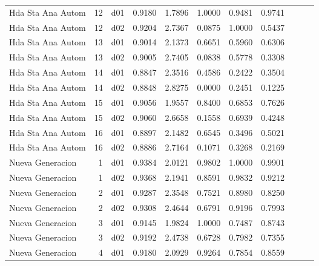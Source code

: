 \begin{landscape}
\begin{longtable}{p{2cm}rrrrrrrrrr}
       Hda Sta Ana Autom  &         12 &     d01 &   0.9180 &  1.7896 &        1.0000 &           0.9481 &  0.9741 \\
       Hda Sta Ana Autom  &         12 &     d02 &   0.9204 &  2.7367 &        0.0875 &           1.0000 &  0.5437 \\
       Hda Sta Ana Autom  &         13 &     d01 &   0.9014 &  2.1373 &        0.6651 &           0.5960 &  0.6306 \\
       Hda Sta Ana Autom  &         13 &     d02 &   0.9005 &  2.7405 &        0.0838 &           0.5778 &  0.3308 \\
       Hda Sta Ana Autom  &         14 &     d01 &   0.8847 &  2.3516 &        0.4586 &           0.2422 &  0.3504 \\
       Hda Sta Ana Autom  &         14 &     d02 &   0.8848 &  2.8275 &        0.0000 &           0.2451 &  0.1225 \\
       Hda Sta Ana Autom  &         15 &     d01 &   0.9056 &  1.9557 &        0.8400 &           0.6853 &  0.7626 \\
       Hda Sta Ana Autom  &         15 &     d02 &   0.9060 &  2.6658 &        0.1558 &           0.6939 &  0.4248 \\
       Hda Sta Ana Autom  &         16 &     d01 &   0.8897 &  2.1482 &        0.6545 &           0.3496 &  0.5021 \\
       Hda Sta Ana Autom  &         16 &     d02 &   0.8886 &  2.7164 &        0.1071 &           0.3268 &  0.2169 \\
        Nueva Generacion  &          1 &     d01 &   0.9384 &  2.0121 &        0.9802 &           1.0000 &  0.9901 \\
        Nueva Generacion  &          1 &     d02 &   0.9368 &  2.1941 &        0.8591 &           0.9832 &  0.9212 \\
        Nueva Generacion  &          2 &     d01 &   0.9287 &  2.3548 &        0.7521 &           0.8980 &  0.8250 \\
        Nueva Generacion  &          2 &     d02 &   0.9308 &  2.4644 &        0.6791 &           0.9196 &  0.7993 \\
        Nueva Generacion  &          3 &     d01 &   0.9145 &  1.9824 &        1.0000 &           0.7487 &  0.8743 \\
        Nueva Generacion  &          3 &     d02 &   0.9192 &  2.4738 &        0.6728 &           0.7982 &  0.7355 \\
        Nueva Generacion  &          4 &     d01 &   0.9180 &  2.0929 &        0.9264 &           0.7854 &  0.8559 \\

\end{longtable}
\end{landscape}
